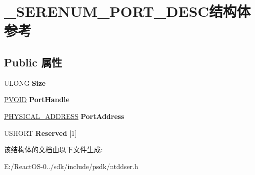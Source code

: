 \hypertarget{struct___s_e_r_e_n_u_m___p_o_r_t___d_e_s_c}{}\section{\+\_\+\+S\+E\+R\+E\+N\+U\+M\+\_\+\+P\+O\+R\+T\+\_\+\+D\+E\+S\+C结构体 参考}
\label{struct___s_e_r_e_n_u_m___p_o_r_t___d_e_s_c}
\subsection*{Public 属性}
\begin{DoxyCompactItemize}
\item 
\mbox{\label{struct___s_e_r_e_n_u_m___p_o_r_t___d_e_s_c_a5638ecc79f5688afbae051aa9c98f3a2}} 
U\+L\+O\+NG {\bfseries Size}
\item 
\mbox{\label{struct___s_e_r_e_n_u_m___p_o_r_t___d_e_s_c_a49c5c05ed5f4cca94ce13c8fcb41acb9}} 
\hyperlink{interfacevoid}{P\+V\+O\+ID} {\bfseries Port\+Handle}
\item 
\mbox{\label{struct___s_e_r_e_n_u_m___p_o_r_t___d_e_s_c_ac4060a138e383687f7c29bc871d340a6}} 
\hyperlink{union___l_a_r_g_e___i_n_t_e_g_e_r}{P\+H\+Y\+S\+I\+C\+A\+L\+\_\+\+A\+D\+D\+R\+E\+SS} {\bfseries Port\+Address}
\item 
\mbox{\label{struct___s_e_r_e_n_u_m___p_o_r_t___d_e_s_c_aaad6a5c04bba3703d472ff68c7463d06}} 
U\+S\+H\+O\+RT {\bfseries Reserved} \mbox{[}1\mbox{]}
\end{DoxyCompactItemize}


该结构体的文档由以下文件生成\+:\begin{DoxyCompactItemize}
\item 
E\+:/\+React\+O\+S-\/0../sdk/include/psdk/ntddser.\+h\end{DoxyCompactItemize}
